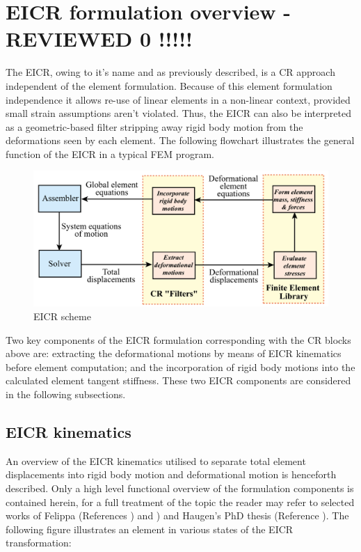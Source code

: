 \section{EICR formulation overview - REVIEWED 0 !!!!!}
The EICR, owing to it's name and as previously described, is a CR approach independent of the element formulation. Because of this element formulation independence it allows re-use of linear elements in a non-linear context, provided small strain assumptions aren't violated. Thus, the EICR can also be interpreted as a geometric-based filter stripping away rigid body motion from the deformations seen by each element. The following flowchart illustrates the general function of the EICR in a typical FEM program.

\begin{figure}[H]
	\centering
	\def\svgwidth{\columnwidth}
	\includegraphics[width=14cm]{images/cr_3.png}
	\caption{EICR scheme \cite{FelippaCR1_2016}}
	\label{cr3}
\end{figure}

Two key components of the EICR formulation corresponding with the CR blocks above are: extracting the deformational motions by means of EICR kinematics before element computation; and the incorporation of rigid body motions into the calculated element tangent stiffness. These two EICR components are considered in the following subsections.

\subsection{EICR kinematics}
An overview of the EICR kinematics utilised to separate total element displacements into rigid body motion and deformational motion is henceforth described. Only a high level functional overview of the formulation components is contained herein, for a full treatment of the topic the reader may refer to selected works of Felippa (References \cite{FelippaCR1_2016}) and \cite{felippa2000systematic}) and Haugen's PhD thesis (Reference \cite{Hau94}). The following figure illustrates an element in various states of the EICR transformation:

